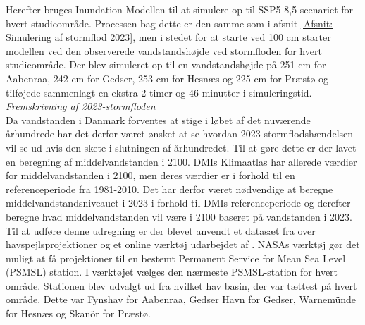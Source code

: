 Herefter bruges Inundation Modellen til at simulere op til SSP5-8,5 scenariet for hvert studieområde. Processen bag dette er den samme som i afsnit \ref{Afsnit: Simulering af stormflod 2023}, men i stedet for at starte ved 100 cm starter modellen ved den observerede vandstandshøjde ved stormfloden for hvert studieområde. Der blev simuleret op til en vandstandshøjde på 251 cm for Aabenraa, 242 cm for Gedser, 253 cm for Hesnæs og 225 cm for Præstø og tilføjede sammenlagt en ekstra 2 timer og 46 minutter i simuleringstid. \\

{\large \textit{Fremskrivning af 2023-stormfloden}} \\
Da vandstanden i Danmark forventes at stige i løbet af det nuværende århundrede har det derfor været ønsket at se hvordan 2023 stormflodshændelsen vil se ud hvis den skete i slutningen af århundredet. Til at gøre dette er der lavet en beregning af middelvandstanden i 2100. DMIs Klimaatlas har allerede værdier for middelvandstanden i 2100, men deres værdier er i forhold til en referenceperiode fra 1981-2010. Det har derfor været nødvendige at beregne middelvandstandsniveauet i 2023 i forhold til DMIs referenceperiode og derefter beregne hvad middelvandstanden vil være i 2100 baseret på vandstanden i 2023.\\ 

Til at udføre denne udregning er der blevet anvendt et datasæt fra \cite{garner_ipcc_2021} over havspejlsprojektioner og et online værktøj udarbejdet af \cite{NASA_tool}. NASAs værktøj gør det muligt at få projektioner til en bestemt Permanent Service for Mean Sea Level (PSMSL) station. I værktøjet vælges den nærmeste PSMSL-station for hvert område. Stationen blev udvalgt ud fra hvilket hav basin, der var tættest på hvert område. Dette var Fynshav for Aabenraa, Gedser Havn for Gedser, Warnemünde for Hesnæs og Skanör for Præstø.\\ 

